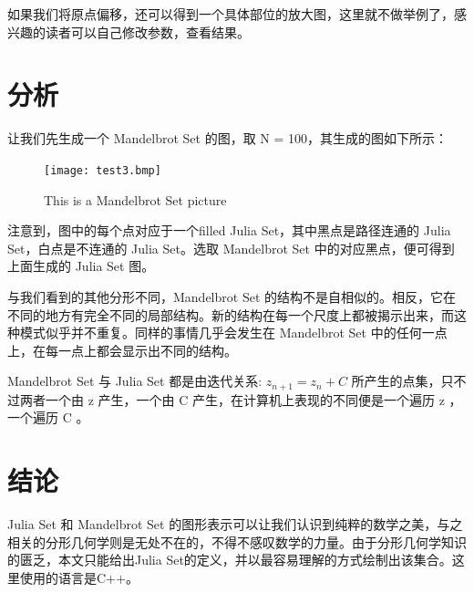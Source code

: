 \documentclass{ctexart}
\begin{document}
\begin{figure}[H]
\centering
{}
\end{figure}

如果我们将原点偏移，还可以得到一个具体部位的放大图，这里就不做举例了，感兴趣的读者可以自己修改参数，查看结果。

\section{分析}

让我们先生成一个 Mandelbrot Set 的图，取 N = 100，其生成的图如下所示：
\begin{figure}[H]
  \centering
  \texttt{[image: test3.bmp]}
  \caption{This is a Mandelbrot Set picture}
\end{figure}
注意到，图中的每个点对应于一个filled Julia Set，其中黑点是路径连通的 Julia Set，白点是不连通的 Julia Set。选取 Mandelbrot Set 中的对应黑点，便可得到上面生成的 Julia Set 图。

与我们看到的其他分形不同，Mandelbrot Set 的结构不是自相似的。相反，它在不同的地方有完全不同的局部结构。新的结构在每一个尺度上都被揭示出来，而这种模式似乎并不重复。同样的事情几乎会发生在 Mandelbrot Set 中的任何一点上，在每一点上都会显示出不同的结构。

Mandelbrot Set 与 Julia Set 都是由迭代关系: $z_{n+1} = z_n + C$ 所产生的点集，只不过两者一个由 z 产生，一个由 C 产生，在计算机上表现的不同便是一个遍历 z ，一个遍历 C 。 \cite{JuliaSet}

\section{结论}

Julia Set 和 Mandelbrot Set 的图形表示可以让我们认识到纯粹的数学之美，与之相关的分形几何学则是无处不在的，不得不感叹数学的力量。由于分形几何学知识的匮乏，本文只能给出Julia Set的定义，并以最容易理解的方式绘制出该集合。这里使用的语言是C++。 \cite{王伊蕾2015LaTeX}



\end{document}

